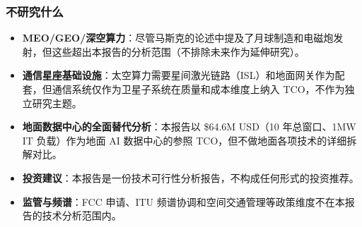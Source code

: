 \subsubsection{不研究什么}

\begin{itemize}[leftmargin=*]
    \item \textbf{MEO/GEO/深空算力}：尽管马斯克的论述中提及了月球制造和电磁炮发射，但这些超出本报告的分析范围（不排除未来作为延伸研究）。
    \item \textbf{通信星座基础设施}：太空算力需要星间激光链路（ISL）和地面网关作为配套，但通信系统仅作为卫星子系统在质量和成本维度上纳入 TCO，不作为独立研究主题。
    \item \textbf{地面数据中心的全面替代分析}：本报告以 \$64.6M USD（10 年总窗口、1\;MW IT 负载）作为地面 AI 数据中心的参照 TCO，但不做地面各项技术的详细拆解对比。
    \item \textbf{投资建议}：本报告是一份技术可行性分析报告，不构成任何形式的投资推荐。
    \item \textbf{监管与频谱}：FCC 申请、ITU 频谱协调和空间交通管理等政策维度不在本报告的技术分析范围内。
\end{itemize}

\endinput
